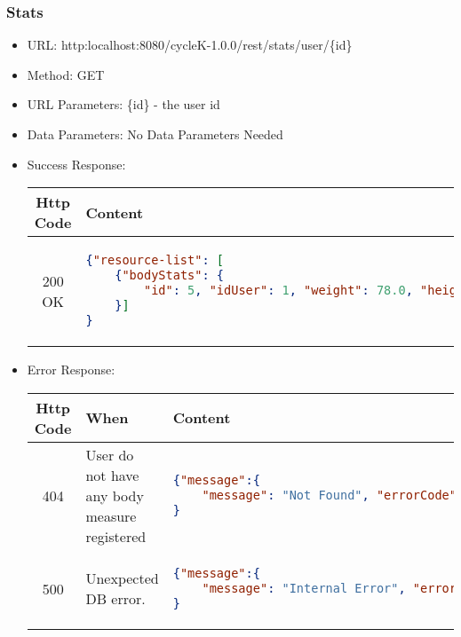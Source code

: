 \subsubsection*{Stats}
\begin{itemize}
\item URL: http:localhost:8080/cycleK-1.0.0/rest/stats/user/\{id\}
\item Method: GET
\item URL Parameters: \{id\} - the user id
\item Data Parameters: No Data Parameters Needed
\item Success Response: 
\begin{longtable}{|c|p{13.5cm}|}
\hline
\textbf{Http Code} & \textbf{Content} \\\hline
200 OK  &
\begin{lstlisting}[language=json,firstnumber=1]
{"resource-list": [
    {"bodyStats": {
        "id": 5, "idUser": 1, "weight": 78.0, "height": 175.0, "fatty": 13.6, "lean": 23.5, "statsDate": "2024-04-09"}
    }]
}
\end{lstlisting}\\\hline
\end{longtable}

\item Error Response:
\begin{longtable}{|c|p{4cm}|p{9cm}|}
\hline
\textbf{Http Code} & \textbf{When} & \textbf{Content} \\\hline
404 &  User do not have any body measure registered &
\begin{lstlisting}[language=json,firstnumber=1]
{"message":{
    "message": "Not Found", "errorCode": "-215", "errorDetails": "No stat found for searched user.", "error": true}
}
\end{lstlisting}\\\hline
500 & Unexpected DB error. & 
\begin{lstlisting}[language=json,firstnumber=1]
{"message":{
    "message": "Internal Error", "errorCode": "-214", "errorDetails": "Unexpected Error while retrieving user stats.", "error": true}
}
\end{lstlisting}\\\hline
\end{longtable}
\end{itemize}
\newpage

